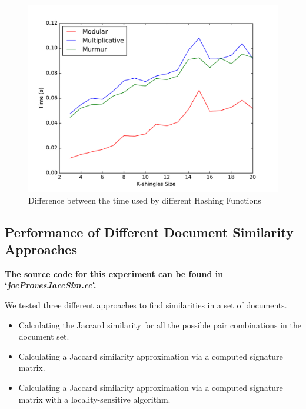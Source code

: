 \documentclass[12pt]{article}
\begin{document}
{\begin{figure}[H]
	\centering
	\includegraphics[scale=0.55]{graphs/HashFunctionsJaccardAproxTime.pdf} 
	\caption{Difference between the time used by different Hashing Functions}
	\label{fig:HhashFunctionsTime}
\end{figure}


\subsection{Performance of Different Document Similarity Approaches}
\textbf{The source code for this experiment can be found in `\textit{jocProvesJaccSim.cc}'.}
\bigskip

We tested three different approaches to find similarities in a set of documents.
\begin{itemize}
\item Calculating the Jaccard similarity for all the possible pair combinations in the document set.
\item Calculating a Jaccard similarity approximation via a computed signature matrix.
\item Calculating a Jaccard similarity approximation via a computed signature matrix with a locality-sensitive algorithm.
\end{itemize}

}
\end{document}
